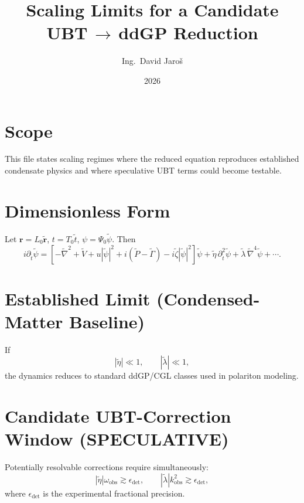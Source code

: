 \documentclass[11pt,a4paper]{article}
\title{Scaling Limits for a Candidate UBT\,$\to$\,ddGP Reduction}
\author{Ing.\ David Jaroš}
\date{2026}
\begin{document}
\maketitle

\section*{Scope}
This file states scaling regimes where the reduced equation reproduces established condensate physics and where speculative UBT terms could become testable.

\section{Dimensionless Form}
Let $\mathbf r=L_0\tilde{\mathbf r}$, $t=T_0\tilde t$, $\psi=\Psi_0\tilde\psi$. Then
\begin{equation}
i\partial_{\tilde t}\tilde\psi=\left[-\tilde\nabla^2+\tilde V+u|\tilde\psi|^2+i(\tilde P-\tilde\Gamma)-i\tilde\zeta|\tilde\psi|^2\right]\tilde\psi+\tilde\eta\,\partial_{\tilde t}^2\tilde\psi+\tilde\lambda\,\tilde\nabla^4\tilde\psi+\cdots.
\end{equation}

\section{Established Limit (Condensed-Matter Baseline)}
If
\begin{equation}
|\tilde\eta|\ll1,\qquad |\tilde\lambda|\ll1,
\end{equation}
the dynamics reduces to standard ddGP/CGL classes used in polariton modeling.

\section{Candidate UBT-Correction Window (SPECULATIVE)}
Potentially resolvable corrections require simultaneously:
\begin{equation}
|\tilde\eta|\omega_{\mathrm{obs}}\gtrsim \epsilon_{\mathrm{det}},
\qquad
|\tilde\lambda|k_{\mathrm{obs}}^2\gtrsim \epsilon_{\mathrm{det}},
\end{equation}
where $\epsilon_{\mathrm{det}}$ is the experimental fractional precision.
\end{document}
